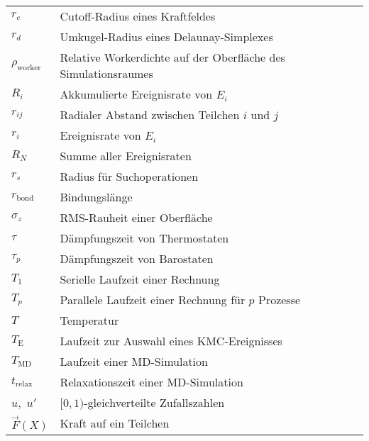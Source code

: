 \begin{longtable}{ll}
$r_c$                & Cutoff-Radius eines Kraftfeldes                                     \\
$r_d$                & Umkugel-Radius eines Delaunay-Simplexes                             \\
$\rho_\text{worker}$ & Relative Workerdichte auf der Oberfläche des Simulationsraumes      \\
$R_i$                & Akkumulierte Ereignisrate von $E_i$                                 \\
$r_{ij}$             & Radialer Abstand zwischen Teilchen $i$ und $j$                      \\
$r_i$                & Ereignisrate von $E_i$                                              \\
$R_N$                & Summe aller Ereignisraten                                           \\
$r_s$                & Radius für Suchoperationen                                          \\
$r_\text{bond}$      & Bindungslänge                                                       \\
$\sigma_z$           & RMS-Rauheit einer Oberfläche                                        \\
$\tau$               & Dämpfungszeit von Thermostaten                                      \\
$\tau_p$             & Dämpfungszeit von Barostaten                                        \\
$T_1$                & Serielle Laufzeit einer Rechnung                                    \\
$T_p$                & Parallele Laufzeit einer Rechnung für $p$ Prozesse                  \\
$T$                  & Temperatur                                                          \\
$T_\text{E}$         & Laufzeit zur Auswahl eines KMC-Ereignisses                          \\
$T_\text{MD}$        & Laufzeit einer MD-Simulation                                        \\
$t_\text{relax}$     & Relaxationszeit einer MD-Simulation                                 \\
$u$,~$u'$            & $[0,1)$-gleichverteilte Zufallszahlen                               \\
$\vec F(X)$          & Kraft auf ein Teilchen                                              \\

\end{longtable}
